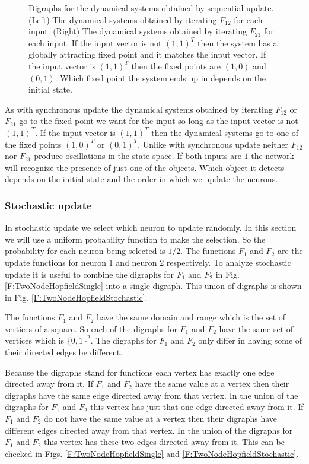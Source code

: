 \begin{figure}[ht]
\caption{Digraphs for the dynamical systems obtained by sequential update. 
(Left) The dynamical systems obtained by iterating $F_{12}$ for each input.  
(Right) The dynamical systems obtained by iterating $F_{21}$ for each input.  
If the input vector is not $(1,1)^T$ then the system has a globally attracting 
fixed point and it matches the input vector.  If the input vector is $(1,1)^T$ 
then the fixed points are $(1,0)$ and $(0,1)$.  Which fixed point the system 
ends up in depends on the initial state.}
\label{F:TwoNodeHopfieldSequence}  
\end{figure}

   As with synchronous update the dynamical systems obtained by iterating 
$F_{12}$ or $F_{21}$ go to the fixed point we want for the input so long as 
the input vector is not $(1,1)^T$.  If the input vector is $(1,1)^T$ then the 
dynamical systems go to one of the fixed points $(1,0)^T$ or $(0,1)^T$.  Unlike
with synchronous update neither $F_{12}$ nor $F_{21}$ produce oscillations in 
the state space.  If both inputs are $1$ the network will recognize the 
presence of just one of the objects.  Which object it detects depends on the 
initial state and the order in which we update the neurons.

\subsubsection{Stochastic update} 

   In stochastic update we select which neuron to update randomly.  In this 
section we will use a uniform probability function to make the selection.  
So the probability for each neuron being selected is $1/2$.  The functions 
$F_1$ and $F_2$ are the update functions for neuron 1 and neuron 2 
respectively.  To analyze stochastic update it is useful to combine the 
digraphs for $F_1$ and $F_2$ in Fig. \ref{F:TwoNodeHopfieldSingle} into a
single digraph.  This union of digraphs is shown in Fig. 
\ref{F:TwoNodeHopfieldStochastic}.  
   
   The functions $F_1$ and $F_2$ have the same domain and range which is the
set of vertices of a square.  So each of the digraphs for $F_1$ and $F_2$ have 
the same set of vertices which is $\{0,1\}^2$.  The digraphs for $F_1$ and 
$F_2$ only differ in having some of their directed edges be different.   

   Because the digraphs stand for functions each vertex has exactly one edge 
directed away from it.  If $F_1$ and $F_2$ have the same value at a vertex then
their digraphs have the same edge directed away from that vertex.  In the 
union of the digraphs for $F_1$ and $F_2$ this vertex has just that one edge
directed away from it.  If $F_1$ and $F_2$ do not have the same value at a 
vertex then their digraphs have different edges directed away from that vertex.
In the union of the digraphs for $F_1$ and $F_2$ this vertex has these two 
edges directed away from it.  This can be checked in Figs. 
\ref{F:TwoNodeHopfieldSingle} and \ref{F:TwoNodeHopfieldStochastic}.  

